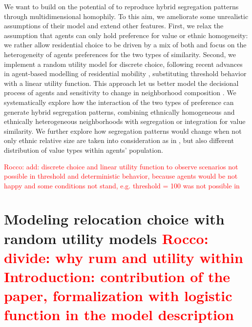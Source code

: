 \documentclass[
]{article}
\begin{document}
We want to build on the potential of \cite{paolillo2018} to reproduce
hybrid segregation patterns through multidimensional homophily. To this
aim, we ameliorate some unrealistic assumptions of their model and
extend other features. First, we relax the assumption that agents can
only hold preference for value or ethnic homogeneity: we rather allow
residential choice to be driven by a mix of both and focus on the
heterogeneity of agents preferences for the two types of similarity.
Second, we implement a random utility model for discrete choice,
following recent advances in agent-based modelling of residential
mobility \citep{bruch2006neighborhood,bruch2012methodological},
substituting threshold behavior with a linear utility function. This
approach let us better model the decisional process of agents and
sensitivity to change in neighborhood composition
\citep{van2009neighborhood}. We systematically explore how the
interaction of the two types of preference can generate hybrid
segregation patterns, combining ethnically homogeneous and ethnically
heterogeneous neighborhoods with segregation or integration for value
similarity. We further explore how segregation patterns would change
when not only ethnic relative size are taken into consideration as in
\cite{paolillo2018}, but also different distribution of value types
within agents' population.

{\textcolor{red}{Rocco: add: discrete choice and linear utility function to observe scenarios not possible in threshold and deterministic behavior, because agents would be not happy and some conditions not stand, e.g. threshold = 100 was not possible in \cite{paolillo2018} }}

\hypertarget{modeling-relocation-choice-with-random-utility-models}{%
\section{\texorpdfstring{Modeling relocation choice with random utility
models
{\textcolor{red}{Rocco: divide: why rum and utility within Introduction: contribution of the paper, formalization with logistic function in the model description}}}{Modeling relocation choice with random utility models }}\label{modeling-relocation-choice-with-random-utility-models}}
\end{document}
